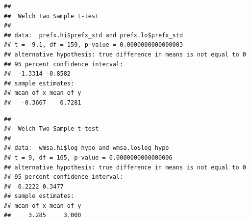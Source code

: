 \documentclass[
]{article}
\newenvironment{Shaded}{\begin{snugshade}}{\end{snugshade}}
\newcommand{\AttributeTok}[1]{\textcolor[rgb]{0.13,0.29,0.53}{#1}}
\newcommand{\ConstantTok}[1]{\textcolor[rgb]{0.56,0.35,0.01}{#1}}
\newcommand{\FloatTok}[1]{\textcolor[rgb]{0.00,0.00,0.81}{#1}}
\newcommand{\FunctionTok}[1]{\textcolor[rgb]{0.13,0.29,0.53}{\textbf{#1}}}
\newcommand{\NormalTok}[1]{#1}
\newcommand{\OtherTok}[1]{\textcolor[rgb]{0.56,0.35,0.01}{#1}}
\newcommand{\SpecialCharTok}[1]{\textcolor[rgb]{0.81,0.36,0.00}{\textbf{#1}}}
\newcommand{\StringTok}[1]{\textcolor[rgb]{0.31,0.60,0.02}{#1}}
\begin{document}
\begin{Shaded}
\end{Shaded}

\begin{verbatim}
## 
##  Welch Two Sample t-test
## 
## data:  prefx.hi$prefx_std and prefx.lo$prefx_std
## t = -9.1, df = 159, p-value = 0.0000000000000003
## alternative hypothesis: true difference in means is not equal to 0
## 95 percent confidence interval:
##  -1.3314 -0.8582
## sample estimates:
## mean of x mean of y 
##   -0.3667    0.7281
\end{verbatim}

\begin{Shaded}
\end{Shaded}

\begin{verbatim}
## 
##  Welch Two Sample t-test
## 
## data:  wmsa.hi$log_hypo and wmsa.lo$log_hypo
## t = 9, df = 165, p-value = 0.0000000000000006
## alternative hypothesis: true difference in means is not equal to 0
## 95 percent confidence interval:
##  0.2222 0.3477
## sample estimates:
## mean of x mean of y 
##     3.285     3.000
\end{verbatim}
\end{document}
